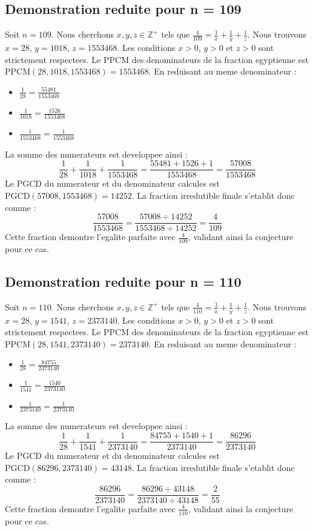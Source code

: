 \documentclass[11pt,a4paper]{article}
\begin{document}
\subsection{Demonstration reduite pour n = 109}
Soit $n = 109$. Nous cherchons $x, y, z \in \mathbb{Z}^{+}$ tels que $\frac{4}{109} = \frac{1}{x} + \frac{1}{y} + \frac{1}{z}$.
Nous trouvons $x = 28$, $y = 1018$, $z = 1553468$.
Les conditions $x > 0$, $y > 0$ et $z > 0$ sont strictement respectees.
Le PPCM des denominateurs de la fraction egyptienne est $\text{PPCM}(28, 1018, 1553468) = 1553468$.
En reduisant au meme denominateur :
\begin{itemize}
    \item $\frac{1}{28} = \frac{55481}{1553468}$
    \item $\frac{1}{1018} = \frac{1526}{1553468}$
    \item $\frac{1}{1553468} = \frac{1}{1553468}$
\end{itemize}
La somme des numerateurs est developpee ainsi :
$$ \frac{1}{28} + \frac{1}{1018} + \frac{1}{1553468} = \frac{55481 + 1526 + 1}{1553468} = \frac{57008}{1553468} $$
Le PGCD du numerateur et du denominateur calcules est $\text{PGCD}(57008, 1553468) = 14252$.
La fraction irredutible finale s'etablit donc comme :
$$ \frac{57008}{1553468} = \frac{57008 \div 14252}{1553468 \div 14252} = \frac{4}{109} $$
Cette fraction demontre l'egalite parfaite avec $\frac{4}{109}$, validant ainsi la conjecture pour ce cas.

\subsection{Demonstration reduite pour n = 110}
Soit $n = 110$. Nous cherchons $x, y, z \in \mathbb{Z}^{+}$ tels que $\frac{4}{110} = \frac{1}{x} + \frac{1}{y} + \frac{1}{z}$.
Nous trouvons $x = 28$, $y = 1541$, $z = 2373140$.
Les conditions $x > 0$, $y > 0$ et $z > 0$ sont strictement respectees.
Le PPCM des denominateurs de la fraction egyptienne est $\text{PPCM}(28, 1541, 2373140) = 2373140$.
En reduisant au meme denominateur :
\begin{itemize}
    \item $\frac{1}{28} = \frac{84755}{2373140}$
    \item $\frac{1}{1541} = \frac{1540}{2373140}$
    \item $\frac{1}{2373140} = \frac{1}{2373140}$
\end{itemize}
La somme des numerateurs est developpee ainsi :
$$ \frac{1}{28} + \frac{1}{1541} + \frac{1}{2373140} = \frac{84755 + 1540 + 1}{2373140} = \frac{86296}{2373140} $$
Le PGCD du numerateur et du denominateur calcules est $\text{PGCD}(86296, 2373140) = 43148$.
La fraction irredutible finale s'etablit donc comme :
$$ \frac{86296}{2373140} = \frac{86296 \div 43148}{2373140 \div 43148} = \frac{2}{55} $$
Cette fraction demontre l'egalite parfaite avec $\frac{4}{110}$, validant ainsi la conjecture pour ce cas.
\end{document}
